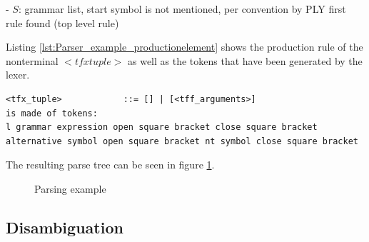 - $S$: grammar list, start symbol is not mentioned, per convention by \ac{PLY} first rule found (top level rule)

Listing \ref{lst:Parser_example_productionelement} shows the production rule of the nonterminal $<tfx tuple>$ as well as the tokens that have been generated by the lexer.

\begin{lstlisting}[basicstyle=\scriptsize	,caption= Production element,label= lst:Parser_example_productionelement]
<tfx_tuple>            ::= [] | [<tff_arguments>]
is made of tokens:
l grammar expression open square bracket close square bracket alternative symbol open square bracket nt symbol close square bracket
\end{lstlisting}

The resulting parse tree can be seen in figure \ref{fig:ImplementationParsing}. 

\begin{figure}[H]
\caption{Parsing example}
\label{fig:ImplementationParsing}
\end{figure}
                
\subsection{Disambiguation}\label{sec:ImplementationParserDisambiguation}
                
